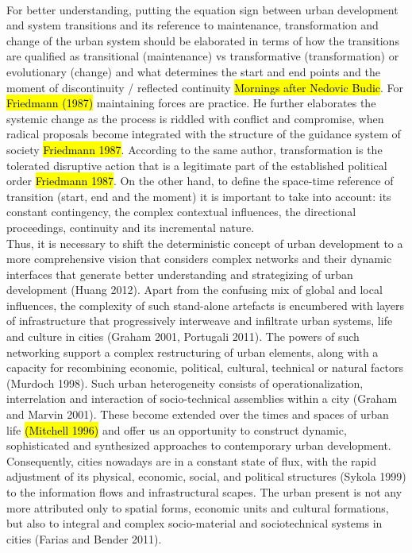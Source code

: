 \documentclass[11pt]{report}
\begin{document}
\\
For better understanding, putting the equation sign between urban development and system transitions and its reference to maintenance, transformation and change of the urban system should be elaborated in terms of how the transitions are qualified as transitional (maintenance) vs transformative (transformation) or evolutionary (change) and what determines the start and end points and the moment of discontinuity / reflected continuity \hl{Mornings after Nedovic Budic}.
For \hl{Friedmann (1987)} maintaining forces are practice.\footnotemark
{}
He further elaborates the systemic change as the process is riddled with conflict and compromise, when radical proposals become integrated with the structure of the guidance system of society \hl{Friedmann 1987}. According to the same author, transformation is the tolerated disruptive action that is a legitimate part of the established political order \hl{Friedmann 1987}.
On the other hand, to define the space-time reference of transition (start, end and the moment) it is important to take into account: its constant contingency, the complex contextual influences, the directional proceedings, continuity and its incremental nature.
\\    
Thus, it is necessary to shift the deterministic concept of urban development to a more comprehensive vision that considers complex networks and their dynamic interfaces that generate better understanding and strategizing of urban development (Huang 2012). Apart from the confusing mix of global and local influences, the complexity of such stand-alone artefacts is encumbered with layers of infrastructure that progressively interweave and infiltrate urban systems, life and culture in cities (Graham 2001, Portugali 2011). The powers of such networking support a complex restructuring of urban elements, along with a capacity for recombining economic, political, cultural, technical or natural factors (Murdoch 1998). Such urban heterogeneity consists of operationalization, interrelation and interaction of socio-technical assemblies within a city (Graham and Marvin 2001). These become extended over the times and spaces of urban life \hl{(Mitchell 1996)} and offer us an opportunity to construct dynamic, sophisticated and synthesized approaches to contemporary urban development. Consequently, cities nowadays are in a constant state of flux, with the rapid adjustment of its physical, economic, social, and political structures (Sykola 1999) to the information flows and infrastructural scapes. The urban present is not any more attributed only to spatial forms, economic units and cultural formations, but also to integral and complex socio-material and sociotechnical systems in cities (Farias and Bender 2011). 
\end{document}
